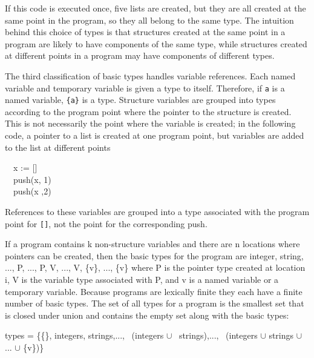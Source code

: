 

If this code is executed once, five lists are created, but they are
all created at the same point in the program, so they all belong to
the same type. The intuition behind this choice of types is that
structures created at the same point in a program are likely to have
components of the same type, while structures created at different
points in a program may have components of different types.

The third classification of basic types handles variable
references. Each named variable and temporary variable is given a type
to itself. Therefore, if \texttt{a} is a named variable,
\texttt{\{a\}} is a type. Structure variables are grouped into types
according to the program point where the pointer to the structure is
created. This is not necessarily the point where the variable is
created; in the following code, a pointer to a list is created at one
program point, but variables are added to the list at different points

\goodbreak
\begin{iconcode}
\ \ x := []\\
\ \ push(x, 1)\\
\ \ push(x ,2)\\
\end{iconcode}


References to these variables are grouped into a type associated with
the program point for \texttt{[]}, not the point for the corresponding
push.

If a program contains k non-structure variables and there are n
locations where pointers can be created, then the basic types for the
program are integer, string, ..., P, ...,
P, V, ..., V,
\{v\}, ..., \{v\} where
P is the pointer type created at location i,
V is the variable type associated with
P, and v is a named variable or a
temporary variable. Because programs are lexically finite they each
have a finite number of basic types. The set of all types for a
program is the smallest set that is closed under union and contains
the empty set along with the basic types:

\begin{specialcode}{}
\>types = \{\{\}, integers, strings,...,~%
    (integers ${\cup}$ \ strings),...,~%
    (integers ${\cup}$ strings ${\cup}$ ... ${\cup}$ \{v\})\}
\end{specialcode}

